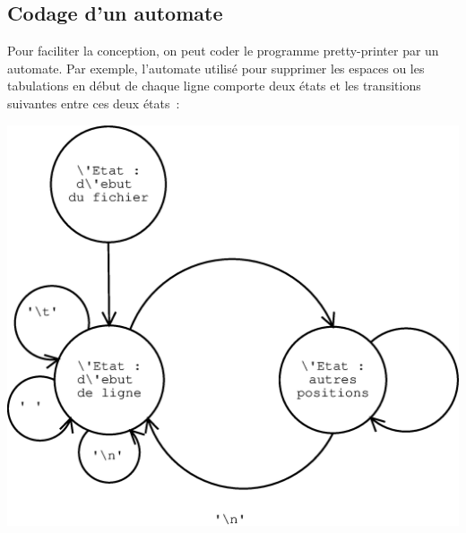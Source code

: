 \subsection{Codage d'un automate}

Pour faciliter la conception, on peut coder le programme
pretty-printer par un automate. Par exemple, l'automate utilis\'e pour
supprimer les espaces ou les tabulations en d\'ebut de chaque ligne
comporte deux \'etats et les transitions suivantes entre ces deux
\'etats~:
\begin{center}
  \includegraphics[scale=.3]{../Illustration/automatepp}  
\end{center}
